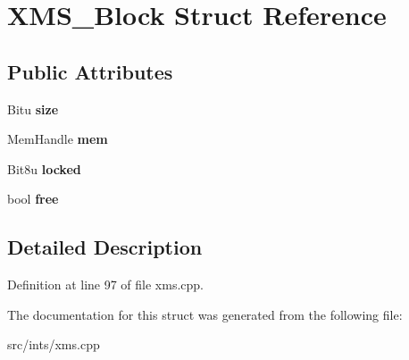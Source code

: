 \hypertarget{structXMS__Block}{\section{X\-M\-S\-\_\-\-Block Struct Reference}
\label{structXMS__Block}
}
\subsection*{Public Attributes}
\begin{DoxyCompactItemize}
\item 
\hypertarget{structXMS__Block_ac64ef7bd634fd3b0e71b2f712ce9ad74}{Bitu {\bfseries size}}\label{structXMS__Block_ac64ef7bd634fd3b0e71b2f712ce9ad74}

\item 
\hypertarget{structXMS__Block_a40362265a08f53dde89854249f3e4b2d}{Mem\-Handle {\bfseries mem}}\label{structXMS__Block_a40362265a08f53dde89854249f3e4b2d}

\item 
\hypertarget{structXMS__Block_aeca5b88beebe3eaa694386c0b04405bf}{Bit8u {\bfseries locked}}\label{structXMS__Block_aeca5b88beebe3eaa694386c0b04405bf}

\item 
\hypertarget{structXMS__Block_a362599c2a44039cd152780f6f46a9023}{bool {\bfseries free}}\label{structXMS__Block_a362599c2a44039cd152780f6f46a9023}

\end{DoxyCompactItemize}


\subsection{Detailed Description}


Definition at line 97 of file xms.\-cpp.



The documentation for this struct was generated from the following file\-:\begin{DoxyCompactItemize}
\item 
src/ints/xms.\-cpp\end{DoxyCompactItemize}
